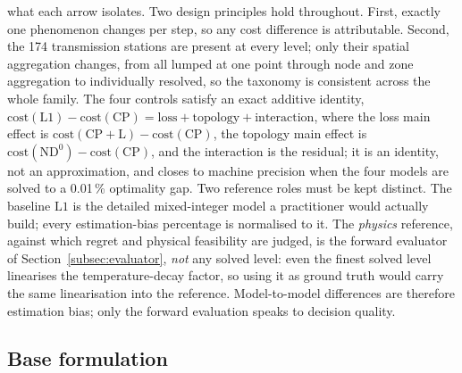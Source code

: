 \documentclass[a4paper,fleqn]{cas-dc}
\newcommand{\CP}{\ensuremath{\mathrm{CP}}}      %
\newcommand{\CPL}{\ensuremath{\mathrm{CP{+}L}}} %
\newcommand{\NDz}{\ensuremath{\mathrm{ND^{0}}}} %
\newcommand{\Lone}{\ensuremath{\mathrm{L1}}}    %
\begin{document}
what each arrow isolates. Two design principles hold throughout. First, exactly one phenomenon
changes per step, so any cost difference is attributable. Second, the 174 transmission stations
are present at every level; only their spatial aggregation changes, from all lumped at one
point through node and zone aggregation to individually resolved, so the taxonomy is consistent
across the whole family. The four controls satisfy an exact additive identity,
$\text{cost}(\Lone)-\text{cost}(\CP)=\text{loss}+\text{topology}+\text{interaction}$, where the
loss main effect is $\text{cost}(\CPL)-\text{cost}(\CP)$, the topology main effect is
$\text{cost}(\NDz)-\text{cost}(\CP)$, and the interaction is the residual; it is an identity,
not an approximation, and closes to machine precision when the four models are solved to a
0.01\,\% optimality gap.
Two reference roles must be kept distinct. The baseline $\Lone$ is the detailed
mixed-integer model a practitioner would actually build; every estimation-bias percentage is
normalised to it. The \emph{physics} reference, against which regret and physical feasibility
are judged, is the forward evaluator of Section~\ref{subsec:evaluator}, \emph{not} any solved
level: even the finest solved level linearises the temperature-decay factor, so using it as
ground truth would carry the same linearisation into the reference. Model-to-model differences
are therefore estimation bias; only the forward evaluation speaks to decision quality.

\subsection{Base formulation}

\end{document}
